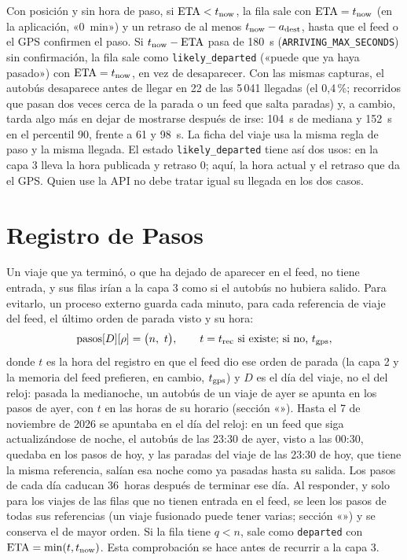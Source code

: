 Con posición y sin hora de paso, si $\mathrm{ETA}<t_{\mathrm{now}}$, la fila sale con $\mathrm{ETA}=t_{\mathrm{now}}$ (en la aplicación, «0~min») y un
retraso de al menos $t_{\mathrm{now}}-a_{\mathrm{dest}}$, hasta que el feed o el GPS confirmen el paso. Si $t_{\mathrm{now}}-\mathrm{ETA}$ pasa de 180~s
(\texttt{ARRIVING\_MAX\_SECONDS}) sin confirmación, la fila sale como \texttt{likely\_departed} («puede que ya haya
pasado») con $\mathrm{ETA}=t_{\mathrm{now}}$, en vez de desaparecer. Con las mismas capturas, el autobús desaparece antes de llegar en
22 de las 5\,041 llegadas (el 0{,}4\,\%; recorridos que pasan dos veces cerca de la parada o un feed que salta
paradas) y, a cambio, tarda algo más en dejar de mostrarse después de irse: 104~s de mediana y 152~s en el percentil
90, frente a 61 y 98~s. La ficha del viaje usa la misma regla de paso y la misma llegada. El estado \texttt{likely\_departed} tiene
así dos usos: en la capa 3 lleva la hora publicada y retraso 0; aquí, la hora actual y el retraso que da el GPS. Quien
use la API no debe tratar igual su llegada en los dos casos.

\section{Registro de Pasos}
\label{sec:registro-pasos}

Un viaje que ya terminó, o que ha dejado de aparecer en el feed, no tiene entrada, y sus filas irían a la capa 3 como
si el autobús no hubiera salido. Para evitarlo, un proceso externo guarda cada minuto, para cada referencia de viaje
del feed, el último orden de parada visto y su hora:
\[
\text{pasos}[D][\rho]=\big(n,\ t\big),\qquad t=t_{\mathrm{rec}}\ \text{si existe; si no, }\tgps,
\]
donde $t$ es la hora del registro en que el feed dio ese orden de parada (la capa 2 y la memoria del feed prefieren, en
cambio, $t_{\mathrm{gps}}$) y $D$ es el día del viaje, no el del reloj: pasada la medianoche, un autobús de un viaje de ayer se
apunta en los pasos de ayer, con $t$ en las horas de su horario (sección «»). Hasta el 7 de
noviembre de 2026 se apuntaba en el día del reloj: en un feed que siga actualizándose de noche, el autobús de las 23:30 de ayer,
visto a las 00:30, quedaba en los
pasos de hoy, y las paradas del viaje de las 23:30 de hoy, que tiene la misma referencia, salían esa noche como ya
pasadas hasta su salida. Los pasos de cada día caducan 36~horas después de terminar ese día. Al responder, y solo para
los viajes de las filas que no tienen entrada en el feed, se leen los pasos de todas sus referencias (un viaje
fusionado puede tener varias; sección «») y se conserva el de mayor orden. Si la fila tiene $q<n$,
sale como \texttt{departed} con $\mathrm{ETA}=\min(t,t_{\mathrm{now}})$. Esta comprobación se hace antes de recurrir a la capa 3.

